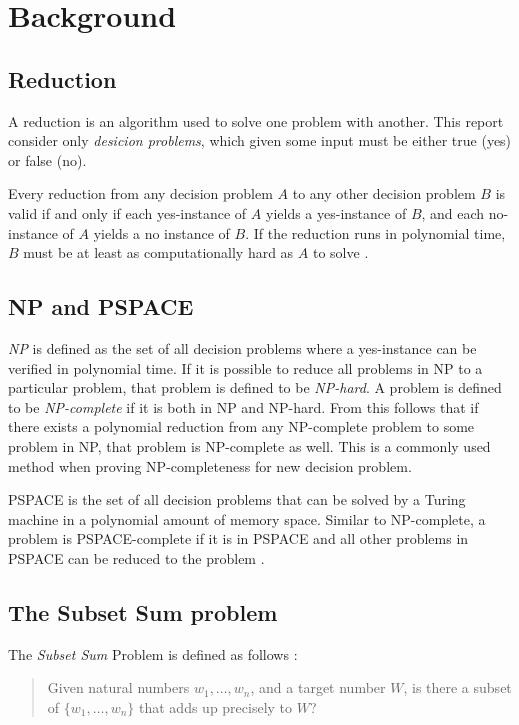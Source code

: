 \section{Background}
\label{sec:background}

\subsection{Reduction}
A reduction is an algorithm used to solve one problem with another. This report consider only \textit{desicion problems}, which given some input must be either true (yes) or false (no).

Every reduction from any decision problem $A$ to any other decision problem $B$ is valid if and only if each yes-instance of $A$ yields a yes-instance of $B$, and each no-instance of $A$ yields a no instance of $B$. If the reduction runs in polynomial time, $B$ must be at least as computationally hard as $A$ to solve \cite{reduction}.

\subsection{NP and PSPACE}
\textit{NP} is defined as the set of all decision problems where a yes-instance can be verified in polynomial time. If it is possible to reduce all problems in NP to a particular problem, that problem is defined to be \textit{NP-hard}. A problem is defined to be \textit{NP-complete} if it is both in NP and NP-hard. From this follows that if there exists a polynomial reduction from any NP-complete problem to some problem in NP, that problem is NP-complete as well. This is a commonly used method when proving NP-completeness for new decision problem.

PSPACE is the set of all decision problems that can be solved by a Turing machine in a polynomial amount of memory space. Similar to NP-complete, a problem is PSPACE-complete if it is in PSPACE and all other problems in PSPACE can be reduced to the problem \cite{komplexitetsklasser}. 

\subsection{The Subset Sum problem}

The \textit{Subset Sum} Problem is defined as follows \cite[p.~491]{algorithm}:

\begin{quote}
Given natural numbers $w_1, \ldots, w_n$, and a target number $W$, is there a subset of $\{w_1, \ldots, w_n \}$ that adds up precisely to $W$?
\end{quote}

